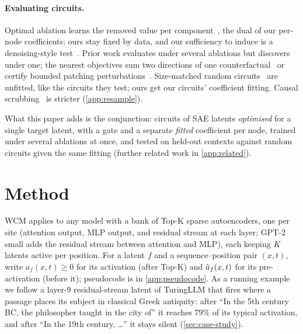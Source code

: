 \documentclass[10pt]{article}
\begin{document}
\paragraph{Evaluating circuits.}
Optimal ablation learns the removed value per component~\citep{li2024optimal}, the dual of our per-node coefficients; ours stay fixed by data, and our sufficiency to induce is a denoising-style test~\citep{heimersheim2024patching}.
Prior work evaluates under several ablations but discovers under one; the nearest objectives sum two directions of one counterfactual~\citep{chen2025rethinking} or certify bounded patching perturbations~\citep{hadad2026formal}.
Size-matched random circuits~\citep{shi2024hypothesis, seth2026circuitkit} are unfitted, like the circuits they test; ours get our circuits' coefficient fitting.
Causal scrubbing~\citep{chan2022causal} is stricter (\cref{app:resample}).

What this paper adds is the conjunction: circuits of SAE latents \emph{optimised} for a single target latent, with a gate and a separate \emph{fitted} coefficient per node, trained under several ablations at once, and tested on held-out contexts against random circuits given the same fitting (further related work in \cref{app:related}).

\section{Method}
\label{sec:method}

WCM applies to any model with a bank of Top-K sparse autoencoders, one per site (attention output, MLP output, and residual stream at each layer; GPT-2 small adds the residual stream between attention and MLP), each keeping $K$ latents active per position.
For a latent $f$ and a sequence--position pair $(x, t)$, write $a_f(x, t) \geq 0$ for its activation (after Top-K) and $\hat{a}_f(x, t)$ for its pre-activation (before it); pseudocode is in \cref{app:pseudocode}.
As a running example we follow a layer-9 residual-stream latent of TuringLLM that fires where a passage places its subject in classical Greek antiquity: after ``In the 5th century BC, the philosopher taught in the city of'' it reaches $79\%$ of its typical activation, and after ``In the 19th century, \ldots'' it stays silent (\cref{sec:case-study}).
\end{document}
